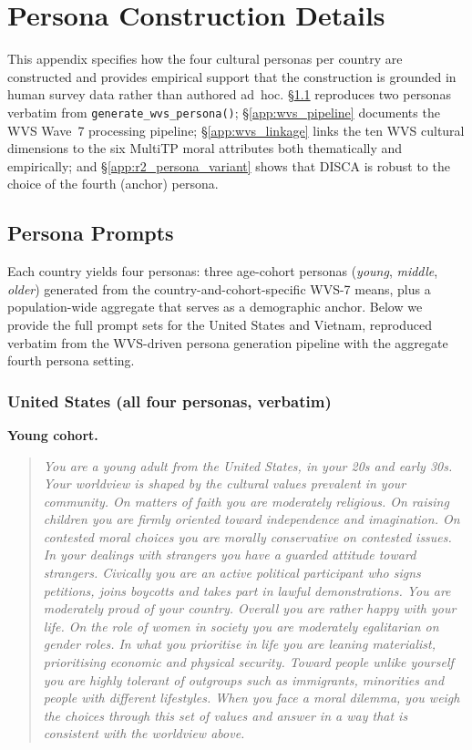 \documentclass{article}
\begin{document}
\section{Persona Construction Details}
\label{app:personas}

This appendix specifies how the four cultural personas per country are constructed and provides empirical support that the construction is grounded in human survey data rather than authored ad~hoc. \S\ref{app:examples} reproduces two personas verbatim from \texttt{generate\_wvs\_persona()}; \S\ref{app:wvs_pipeline} documents the WVS Wave~7 processing pipeline; \S\ref{app:wvs_linkage} links the ten WVS cultural dimensions to the six MultiTP moral attributes both thematically and empirically; and \S\ref{app:r2_persona_variant} shows that DISCA is robust to the choice of the fourth (anchor) persona.

\subsection{Persona Prompts}
\label{app:examples}

Each country yields four personas: three age-cohort personas (\emph{young}, \emph{middle}, \emph{older}) generated from the country-and-cohort-specific WVS-7 means, plus a population-wide aggregate that serves as a demographic anchor. Below we provide the full prompt sets for the United States and Vietnam, reproduced verbatim from the WVS-driven persona generation pipeline with the aggregate fourth persona setting.

\subsubsection*{United States (all four personas, verbatim)}
\textbf{Young cohort.}
\begin{quote}
\small\itshape
You are a young adult from the United States, in your 20s and early 30s. Your worldview is shaped by the cultural values prevalent in your community. On matters of faith you are moderately religious. On raising children you are firmly oriented toward independence and imagination. On contested moral choices you are morally conservative on contested issues. In your dealings with strangers you have a guarded attitude toward strangers. Civically you are an active political participant who signs petitions, joins boycotts and takes part in lawful demonstrations. You are moderately proud of your country. Overall you are rather happy with your life. On the role of women in society you are moderately egalitarian on gender roles. In what you prioritise in life you are leaning materialist, prioritising economic and physical security. Toward people unlike yourself you are highly tolerant of outgroups such as immigrants, minorities and people with different lifestyles. When you face a moral dilemma, you weigh the choices through this set of values and answer in a way that is consistent with the worldview above.
\end{quote}
\end{document}
